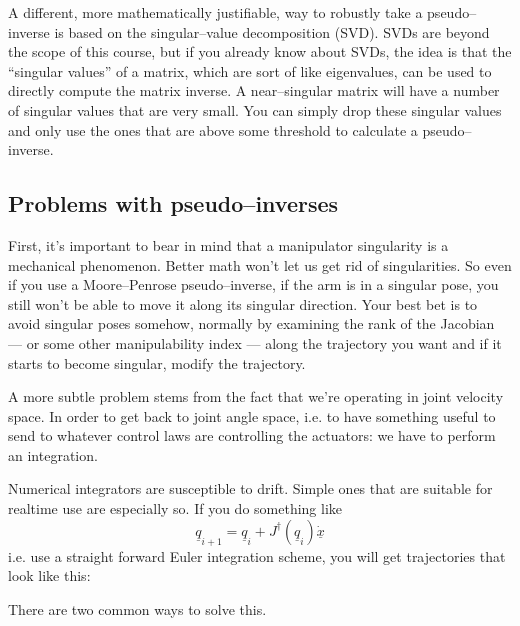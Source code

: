 \documentclass[]{article}
\begin{document}
A different, more mathematically justifiable, way to robustly take a pseudo--inverse is based on the singular--value decomposition (SVD). SVDs are beyond the scope of this course, but if you already know about SVDs, the idea is that the ``singular values'' of a matrix, which are sort of like eigenvalues, can be used to directly compute the matrix inverse. A near--singular matrix will have a number of singular values that are very small. You can simply drop these singular values and only use the ones that are above some threshold to calculate a pseudo--inverse.

\subsection{Problems with pseudo--inverses}
First, it's important to bear in mind that a manipulator singularity is a mechanical phenomenon. Better math won't let us get rid of singularities. So even if you use a Moore--Penrose pseudo--inverse, if the arm is in a singular pose, you still won't be able to move it along its singular direction. Your best bet is to avoid singular poses somehow, normally by examining the rank of the Jacobian --- or some other manipulability index --- along the trajectory you want and if it starts to become singular, modify the trajectory.

A more subtle problem stems from the fact that we're operating in joint velocity space. In order to get back to joint angle space, i.e. to have something useful to send to whatever control laws are controlling the actuators: we have to perform an integration.

Numerical integrators are susceptible to drift. Simple ones that are suitable for realtime use are especially so. If you do something like
\begin{displaymath}
\underline{q}_{i+1} = \underline{q}_{i} + J^{\dag}(\underline{q}_{i})\dot{\underline{x}}
\end{displaymath}
i.e. use a straight forward Euler integration scheme, you will get trajectories that look like this:

\begin{figure}[h!]
	\centering
\end{figure}
There are two common ways to solve this. 
\end{document}
